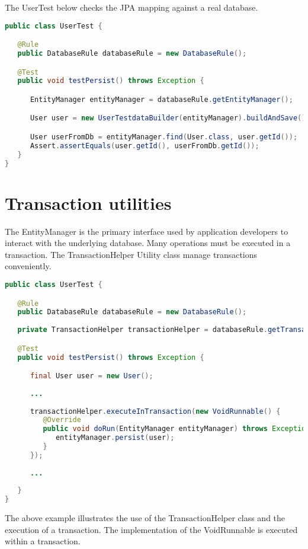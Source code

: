 The UserTest below checks the JPA mapping against a real database.

\begin{lstlisting}[language={JAVA},caption=User persistence test]
public class UserTest {

   @Rule
   public DatabaseRule databaseRule = new DatabaseRule();

   @Test
   public void testPersist() throws Exception {

      EntityManager entityManager = databaseRule.getEntityManager();

      User user = new UserTestdataBuilder(entityManager).buildAndSave();

      User userFromDb = entityManager.find(User.class, user.getId());
      Assert.assertEquals(user.getId(), userFromDb.getId());
   }
}
\end{lstlisting}

\section{Transaction utilities}

The EntityManager is the primary interface used by application developers to interact with the underlying database. Many operations must be executed in a transaction.
The TransactionHelper Utility class manage transactions conveniently.

\begin{lstlisting}[language={JAVA},caption=Transaction utilities]
public class UserTest {

   @Rule
   public DatabaseRule databaseRule = new DatabaseRule();
   
   private TransactionHelper transactionHelper = databaseRule.getTransactionHelper();

   @Test
   public void testPersist() throws Exception {

      final User user = new User();
      
      ...
      
      transactionHelper.executeInTransaction(new VoidRunnable() {
         @Override
         public void doRun(EntityManager entityManager) throws Exception {
            entityManager.persist(user);
         }
      });
      
      ...
      
   }
}
\end{lstlisting}

The above example illustrates the use of the TransactionHelper class and the execution of a transaction. The implementation of the VoidRunnable is executed within a transaction.

